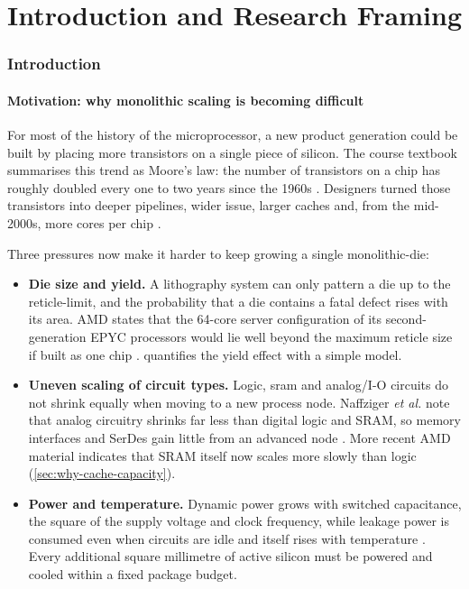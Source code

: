 \clearpage
\part{Introduction and Research Framing}
\label{part:intro}

\section{Introduction}
\label{sec:intro}

\subsection{Motivation: why monolithic scaling is becoming difficult}
\label{sec:motivation}

For most of the history of the microprocessor, a new product generation could be built by placing more transistors on a single piece of silicon. The course textbook summarises this trend as Moore's law: the number of transistors on a chip has roughly doubled every one to two years since the 1960s \cite[sec.~12.1.1]{sarangi2025basic}. Designers turned those transistors into deeper pipelines, wider issue, larger caches and, from the mid-2000s, more cores per chip \cite[ch.~12]{sarangi2025basic}.

Three pressures now make it harder to keep growing a single \gls{monolithic-die}:

\begin{itemize}
  \item \textbf{Die size and yield.} A lithography system can only pattern a die up to the \gls{reticle-limit}, and the probability that a die contains a fatal defect rises with its area. AMD states that the 64-core server configuration of its second-generation EPYC processors would lie well beyond the maximum reticle size if built as one chip \cite{naffziger2020chiplet}.  quantifies the yield effect with a simple model.
  \item \textbf{Uneven scaling of circuit types.} Logic, \gls{sram} and analog/I-O circuits do not shrink equally when moving to a new process node. Naffziger \emph{et al.} note that analog circuitry shrinks far less than digital logic and SRAM, so memory interfaces and SerDes gain little from an advanced node \cite{naffziger2020chiplet}. More recent AMD material indicates that SRAM itself now scales more slowly than logic (\cref{sec:why-cache-capacity}).
  \item \textbf{Power and temperature.} Dynamic power grows with switched capacitance, the square of the supply voltage and clock frequency, while leakage power is consumed even when circuits are idle and itself rises with temperature \cite[sec.~10.10]{sarangi2025basic}. Every additional square millimetre of active silicon must be powered and cooled within a fixed package budget.
\end{itemize}

